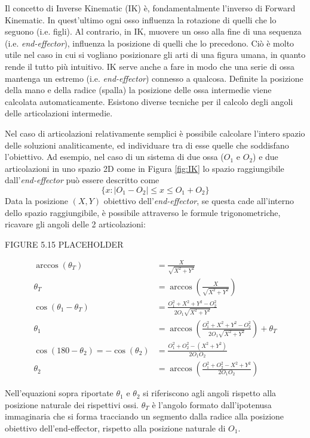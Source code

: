 Il concetto di Inverse Kinematic (IK) è, fondamentalmente l'inverso di Forward Kinematic. In quest'ultimo ogni osso influenza la rotazione di quelli che lo seguono (i.e. figli).
Al contrario, in IK, muovere un osso alla fine di una sequenza (i.e. \emph{end-effector}), influenza la posizione di quelli che lo precedono.
Ciò è molto utile nel caso in cui si vogliano posizionare gli arti di una figura umana, in quanto rende il tutto più intuitivo.
IK serve anche a fare in modo che una serie di ossa mantenga un estremo (i.e. \emph{end-effector}) connesso a qualcosa.
Definite la posizione della mano e della radice (spalla) la posizione delle ossa intermedie viene calcolata automaticamente.
Esistono diverse tecniche per il calcolo degli angoli delle articolazioni intermedie.

Nel caso di articolazioni relativamente semplici è possibile calcolare l'intero spazio delle soluzioni analiticamente, ed individuare tra di esse quelle che soddisfano l'obiettivo.
Ad esempio, nel caso di un sistema di due ossa ($O_1$ e $O_2$) e due articolazioni in uno spazio 2D come in Figura \ref{fig:IK} lo spazio raggiungibile dall'\emph{end-effector} può essere descritto come 
\begin{equation*}
    \{x: |O_1-O_2| \leq x \leq O_1+O_2\}
\end{equation*}
\newpage
Data la posizione $(X,Y)$ obiettivo dell'\emph{end-effector}, se questa cade all'interno dello spazio raggiungibile, è possibile attraverso le formule trigonometriche, ricavare gli angoli delle 2 articolazioni:

FIGURE 5.15 PLACEHOLDER 

\begin{align}
    \arccos{ (\theta _T) } &=  \frac{X}{\sqrt{X^2+Y^2}}\\
    \theta_T &= \arccos{\left(  \frac{X}{\sqrt{X^2+Y^2}} \right)}\\
    \cos{( \theta_1-\theta_T )} &=  \frac{O_1^2+X^2+Y^2-O_2^2}{2O_1\sqrt{X^2+Y^2}}\\
    \theta_1 &= \arccos{\left(  \frac{O_1^2+X^2+Y^2-O_2^2}{2O_1\sqrt{X^2+Y^2}}\right)}+\theta_T\\
    \cos{(180-\theta_2)} = -\cos{(\theta_2)} &= \frac{O_1^2+O_2^2-(X^2+Y^2)}{2O_1O_2}\\
    \theta_2 &= \arccos{\left(\frac{O_1^2+O_2^2-X^2+Y^2}{2O_1O_2}\right)}
\end{align}

Nell'equazioni sopra riportate $\theta_1$ e $\theta_2$ si riferiscono agli angoli rispetto alla posizione naturale dei rispettivi ossi.
$\theta_T$ è l'angolo formato dall'ipotenusa immaginaria che si forma tracciando un segmento dalla radice alla posizione obiettivo dell'end-effector, rispetto alla posizione naturale di $O_1$.

